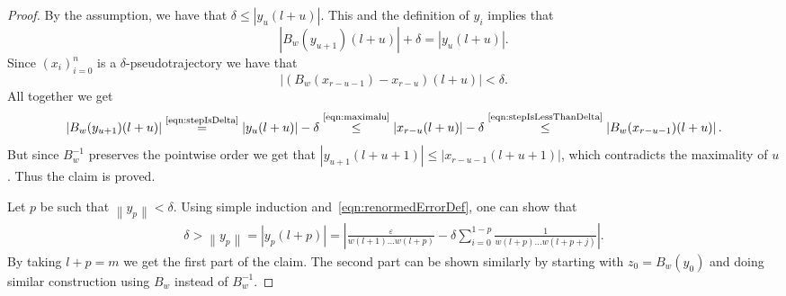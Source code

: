 \documentclass[10pt,a4paper]{amsart}
\newcommand{\abs}[1]{\left| #1 \right|}
\newcommand{\eqNote}[1]{\stackrel{\text{#1}}{=}}
\newcommand{\leqNote}[1]{\stackrel{\text{#1}}{\leq}}
\newcommand{\norm}[1]{\left\| #1 \right\|}
\begin{document}
\begin{proof}
		By the assumption, we have that \(\delta \leq \abs{y_u(l+u)}\). This and the definition of \(y_i\) implies that
		\begin{equation} \label{eqn:stepIsDelta}
			\abs{B_w(y_{u+1})(l+u)}+\delta = \abs{y_{u}(l+u)}.    
		\end{equation}
		Since \((x_i)_{i=0}^{n}\) is a \(\delta\)-pseudotrajectory we have that
		\begin{equation} \label{eqn:stepIsLessThanDelta}
			\abs{(B_w(x_{r-u-1})-x_{r-u})(l+u)} < \delta.
		\end{equation}
		All together we get
		\begin{equation*}
			\abs{B_w(y_{u+1})(l+u)}
			\eqNote{\eqref{eqn:stepIsDelta}} \abs{y_u(l+u)}-\delta
			\leqNote{\eqref{eqn:maximalu}} \abs{x_{r-u}(l+u)}-\delta
			\leqNote{\eqref{eqn:stepIsLessThanDelta}} \abs{B_w(x_{r-u-1})(l+u)}.
		\end{equation*}
		But since \(B^{-1}_w\) preserves the pointwise order we get that \(\abs{y_{u+1}(l+u+1)} \leq \abs{x_{r-u-1}(l+u+1)}\), which contradicts the maximality of \(u\). Thus the claim is proved.
		
		
		Let \(p\) be such that \(\norm{y_p} < \delta\). Using simple induction and~\eqref{eqn:renormedErrorDef}, one can show that
		\begin{align*}
			\delta > \norm{y_p} = \abs{y_p(l+p)} = \abs{\frac{\varepsilon}{w(l+1)\dots w(l+p)}- \delta \sum_{i=0}^{1-p}\frac{1}{w(l+p) \dots w(l+p+j)}}. 
		\end{align*}
		By taking \(l+p = m\) we get the first part of the claim. The second part can be shown similarly by starting with \(z_0 = B_w(y_0)\) and doing similar construction using \(B_w\) instead of \(B^{-1}_w\).
	\end{proof}
\end{document}
